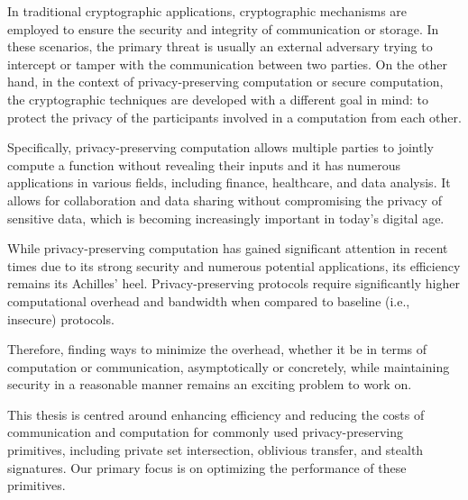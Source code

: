 
In traditional cryptographic applications, cryptographic mechanisms are employed to ensure the security and integrity of communication or storage. In these scenarios, the primary threat is usually an external adversary trying to intercept or tamper with the communication between two parties. On the other hand, in the context of privacy-preserving computation or secure computation, the cryptographic techniques are developed with a different goal in mind: to protect the privacy of the participants involved in a computation from each other.

Specifically, privacy-preserving computation allows multiple parties to jointly compute a function without revealing their inputs and it has numerous applications in various fields, including finance, healthcare, and data analysis. It allows for collaboration and data sharing without compromising the privacy of sensitive data, which is becoming increasingly important in today's digital age.

While privacy-preserving computation has gained significant attention in recent times due to its strong security and numerous potential applications, its efficiency remains its Achilles' heel. Privacy-preserving protocols require significantly higher computational overhead and bandwidth when compared to baseline (i.e., insecure) protocols.

Therefore, finding ways to minimize the overhead, whether it be in terms of computation or communication, asymptotically or concretely, while maintaining security in a reasonable manner remains an exciting problem to work on.

This thesis is centred around enhancing efficiency and reducing the costs of communication and computation for commonly used privacy-preserving primitives, including private set intersection, oblivious transfer, and stealth signatures. Our primary focus is on optimizing the performance of these primitives. 